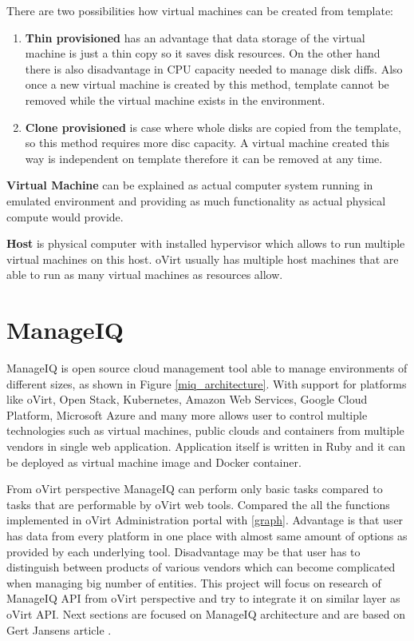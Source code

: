 \noindent There are two possibilities how virtual machines can be created from template: 
\begin{enumerate}

\item \textbf{Thin provisioned} has an advantage that data storage of the virtual machine is just a thin copy so it saves disk resources. On the other hand there is also disadvantage in CPU capacity needed to manage disk diffs. Also once a new virtual machine is created by this method, template cannot be removed while the virtual machine exists in the environment. 

\item \textbf{Clone provisioned} is case where whole disks are copied from the template, so this method requires more disc capacity. A virtual machine created this way is independent on template therefore it can be removed at any time. 
\end{enumerate} 

\textbf{Virtual Machine} can be explained as actual computer system running in emulated environment and providing as much functionality as actual physical compute would provide.

\textbf{Host} is physical computer with installed hypervisor which allows to run multiple virtual machines on this host. oVirt usually has multiple host machines that are able to run as many virtual machines as resources allow.

\chapter{ManageIQ}\label{MIQ}
ManageIQ is open source cloud management tool able to manage environments of different sizes, as shown in Figure  \ref{miq_architecture}. With support for platforms like oVirt, Open Stack, Kubernetes, Amazon Web Services, Google Cloud Platform, Microsoft Azure and many more allows user to control multiple technologies such as virtual machines, public clouds and containers from multiple vendors in single web application.
Application itself is written in Ruby and it can be deployed as virtual machine image and Docker container. 

From oVirt perspective ManageIQ can perform only basic tasks compared to tasks that are performable by oVirt web tools. Compared the all the functions implemented in oVirt Administration portal with \ref{graph}. Advantage is that user has data from every platform in one place with almost same amount of options as provided by each underlying tool. Disadvantage may be that user has to distinguish between products of various vendors which can become complicated when managing big number of entities. This project will focus on research of ManageIQ API from oVirt perspective and try to integrate it on similar layer as oVirt API.
Next sections are focused on ManageIQ architecture and are based on Gert Jansens article \cite{ManageIQarchitecture}.

